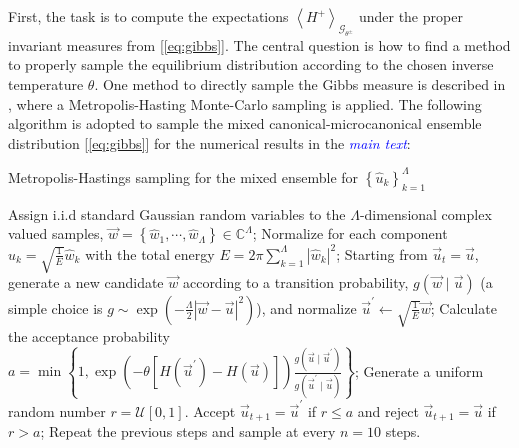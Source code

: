 \documentclass[9pt,twoside,lineno]{pnas-new}
\theoremstyle{plain}
\theoremstyle{plain}
\begin{document}
First, the task is to compute the expectations $\left\langle H^{+}\right\rangle _{\mathcal{G}_{\theta^{\pm}}}$
under the proper invariant measures from [\ref{eq:gibbs}]. The central
question is how to find a method to properly sample the equilibrium
distribution according to the chosen inverse temperature
$\theta$. One method to directly sample the Gibbs measure is
described in \cite{abramov2003hamiltonian}, where a Metropolis-Hasting
Monte-Carlo sampling is applied. The following algorithm is adopted
to sample the mixed canonical-microcanonical ensemble distribution
[\ref{eq:gibbs}] for the numerical results in the \textcolor{blue}{\emph{main text}}:
\begin{algorithm}
\caption{Metropolis-Hastings sampling for the
mixed ensemble for $\left\{ \hat{u}_{k}\right\} _{k=1}^{\Lambda}$}\label{alg:Metropolis-Hastings}

\begin{algorithmic}[1]
\State Assign i.i.d standard Gaussian random variables to the $\Lambda$-dimensional
complex valued samples, $\vec{w}=\left\{ \hat{w}_{1},\cdots,\hat{w}_{\Lambda}\right\} \in\mathbb{C}^{\Lambda}$;
\State Normalize for each component $\hat{u}_{k}=\sqrt{\frac{1}{E}}\hat{w}_{k}$
with the total energy $E=2\pi\sum_{k=1}^{\Lambda}\left|\hat{w}_{k}\right|^{2}$;
\State Starting from $\vec{u}_{t}=\vec{u}$, generate a new candidate $\vec{w}$
according to a transition probability, $g\left(\vec{w}\mid\vec{u}\right)$
(a simple choice is $g\sim\exp\left(-\frac{\Lambda}{2}\left|\vec{w}-\vec{u}\right|^{2}\right)$),
and normalize $\vec{u}^{\prime}\leftarrow\sqrt{\frac{1}{E}}\vec{w}$;
\State Calculate the acceptance probability $a=\min\left\{ 1,\exp\left(-\theta\left[H\left(\vec{u}^{\prime}\right)-H\left(\vec{u}\right)\right]\right)\frac{g\left(\vec{u}\mid\vec{u}^{\prime}\right)}{g\left(\vec{u}^{\prime}\mid\vec{u}\right)}\right\} $;
\State Generate a uniform random number $r=\mathcal{U}\left[0,1\right]$.
Accept $\vec{u}_{t+1}=\vec{u}^{\prime}$ if $r\leq a$ and reject
$\vec{u}_{t+1}=\vec{u}$ if $r>a$;
\State Repeat the previous steps and sample at every $n=10$ steps.
\end{algorithmic}
\end{algorithm}
\end{document}
